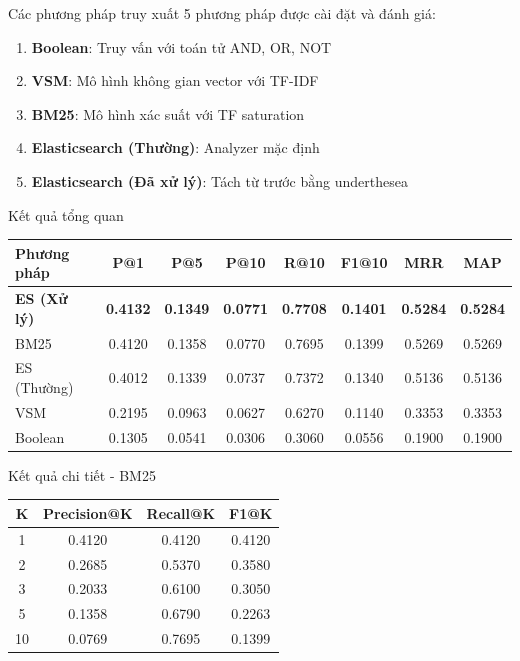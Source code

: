 \documentclass[serif, aspectratio=169]{beamer}
\begin{document}
\begin{frame}{Các phương pháp truy xuất}
5 phương pháp được cài đặt và đánh giá:
\begin{enumerate}
    \item \textbf{Boolean}: Truy vấn với toán tử AND, OR, NOT
    \item \textbf{VSM}: Mô hình không gian vector với TF-IDF
    \item \textbf{BM25}: Mô hình xác suất với TF saturation
    \item \textbf{Elasticsearch (Thường)}: Analyzer mặc định
    \item \textbf{Elasticsearch (Đã xử lý)}: Tách từ trước bằng underthesea
\end{enumerate}
\end{frame}

\begin{frame}{Kết quả tổng quan}
\begin{table}
\centering
\small
\begin{tabular}{lccccccc}
\hline
Phương pháp & P@1 & P@5 & P@10 & R@10 & F1@10 & MRR & MAP \\
\hline
\textbf{ES (Xử lý)} & \textbf{0.4132} & \textbf{0.1349} & \textbf{0.0771} & \textbf{0.7708} & \textbf{0.1401} & \textbf{0.5284} & \textbf{0.5284} \\
BM25 & 0.4120 & 0.1358 & 0.0770 & 0.7695 & 0.1399 & 0.5269 & 0.5269 \\
ES (Thường) & 0.4012 & 0.1339 & 0.0737 & 0.7372 & 0.1340 & 0.5136 & 0.5136 \\
VSM & 0.2195 & 0.0963 & 0.0627 & 0.6270 & 0.1140 & 0.3353 & 0.3353 \\
Boolean & 0.1305 & 0.0541 & 0.0306 & 0.3060 & 0.0556 & 0.1900 & 0.1900 \\
\hline
\end{tabular}
\end{table}
\end{frame}

\begin{frame}{Kết quả chi tiết - BM25}
\begin{table}
\centering
\begin{tabular}{cccc}
\hline
K & Precision@K & Recall@K & F1@K \\
\hline
1  & 0.4120 & 0.4120 & 0.4120 \\
2  & 0.2685 & 0.5370 & 0.3580 \\
3  & 0.2033 & 0.6100 & 0.3050 \\
5  & 0.1358 & 0.6790 & 0.2263 \\
10 & 0.0769 & 0.7695 & 0.1399 \\
\hline
\end{tabular}
\end{table}
\end{frame}
\end{document}
